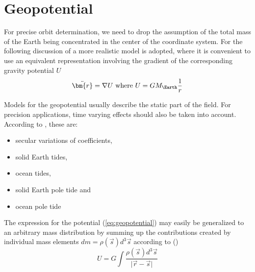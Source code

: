 \section{Geopotential}
For precise orbit determination, we need to drop the assumption of the total mass 
of the Earth being concentrated in the center of the coordinate system. For the
following discussion of a more realistic model is adopted, where it is convenient 
to use an equivalent representation involving the gradient of the corresponding 
gravity potential \(U\)
\begin{equation}
    \label{eq:geopotential}
    \ddot{\bm{r}} = \nabla U \textrm{ where } U = G M_{\Earth} \frac{1}{r}
\end{equation}

Models for the geopotential usually describe the static part of the field. For 
precision applications, time varying effects should also be taken into account. 
According to \cite{iers2010}, these are:
\begin{itemize}
  \item secular variations of coefficients,
  \item solid Earth tides,
  \item ocean tides,
  \item solid Earth pole tide and
  \item ocean pole tide
\end{itemize}

The expression for the potential (\ref{eq:geopotential}) may easily be 
generalized to an arbitrary mass distribution by summing up the contributions 
created by individual mass elements
\(dm = \rho(\vec{s}) d^3 \vec{s}\) according to (\cite{Montenbruck2000})
\begin{equation}
    U = G \int{\frac{\rho(\vec{s}) d^3 \vec{s}}{\lvert \vec{r} - \vec{s} \rvert}}
\end{equation}


